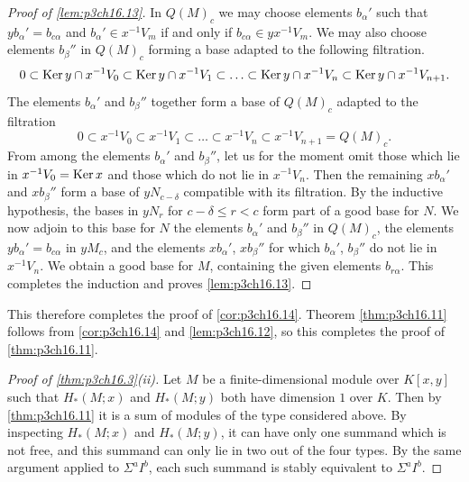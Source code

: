 \documentclass[../main]{subfiles}
\begin{document}
\begin{proof}[Proof of \ref{lem:p3ch16.13}]
In $Q(M)_c$ we may choose elements $b_\alpha'$ such that $yb_\alpha'=b_{c\alpha}$ and $b_\alpha'\in x^{-1}V_m$ if and only if $b_{c\alpha}\in yx^{-1}V_m$. We may also choose elements $b_\beta''$ in $Q(M)_c$ forming a base adapted to the following filtration.
\[0\subset\mathrm{Ker}\,y\cap x^{-1}V_0\subset\mathrm{Ker}\,y\cap x^{-1}V_1\subset\ldots\subset\mathrm{Ker}\,y\cap x^{-1}V_n\subset\mathrm{Ker}\,y\cap x^{-1}V_{n+1}.\]
The elements $b_\alpha'$ and $b_\beta''$ together form a base of $Q(M)_c$ adapted to the filtration
\[0\subset x^{-1}V_0\subset x^{-1}V_1\subset\ldots\subset x^{-1}V_n\subset x^{-1}V_{n+1}=Q(M)_c.\]
From among the elements $b_\alpha'$ and $b_\beta''$, let us for the moment omit those which lie in $x^{-1}V_0=\mathrm{Ker}\,x$ and those which do not lie in $x^{-1}V_n$. Then the remaining $xb_\alpha'$ and $xb_\beta''$ form a base of $yN_{c-\delta}$ compatible with its filtration. By the inductive hypothesis, the bases in $yN_r$ for $c-\delta\le r<c$ form part of a good base for $N$. We now adjoin to this base for $N$ the elements $b_\alpha'$ and $b_\beta''$ in $Q(M)_c$, the elements $yb_\alpha'=b_{c\alpha}$ in $yM_c$, and the elements $xb_\alpha'$, $xb_\beta''$ for which $b_\alpha'$, $b_\beta''$ do not lie in $x^{-1}V_n$. We obtain a good base for $M$, containing the given elements $b_{r\alpha}$. This completes the induction and proves \ref{lem:p3ch16.13}.
\end{proof}

This therefore completes the proof of \ref{cor:p3ch16.14}. Theorem \ref{thm:p3ch16.11} follows from \ref{cor:p3ch16.14} and \ref{lem:p3ch16.12}, so this completes the proof of \ref{thm:p3ch16.11}. 

\begin{proof}[Proof of \ref{thm:p3ch16.3}(ii)]
Let $M$ be a finite-dimensional module over $K[x, y]$ such that $H_\ast(M; x)$ and $H_\ast(M; y)$ both have dimension $1$ over $K$. Then by \ref{thm:p3ch16.11} it is a sum of modules of the type considered above. By inspecting $H_\ast(M; x)$ and $H_\ast(M; y)$, it can have only one summand which is not free, and this summand can only lie in two out of the four types. By the same argument applied to $\Sigma^a I^b$, each such summand is stably equivalent to $\Sigma^a I^b$. 
\end{proof}
\end{document}
